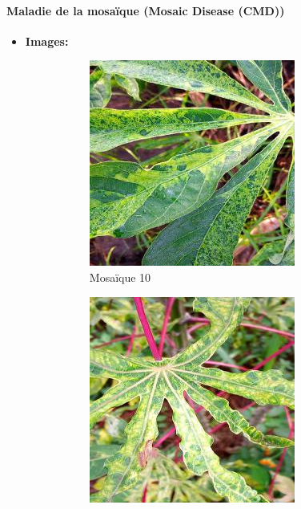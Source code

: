 \paragraph{Maladie de la mosaïque (Mosaic Disease (CMD))}
\begin{itemize}
	\item \textbf{Images: }
	\begin{figure}[htbp]
		\centering
		\begin{subfigure}[b]{0.3\textwidth}
			\centering
			\includegraphics[width=\textwidth]{images/10.jpg}
			\caption{Mosaïque 10}
		\end{subfigure}
		\hfill
		\begin{subfigure}[b]{0.3\textwidth}
			\centering
			\includegraphics[width=\textwidth]{images/11.jpg}

\end{subfigure}
\end{figure}
\end{itemize}

